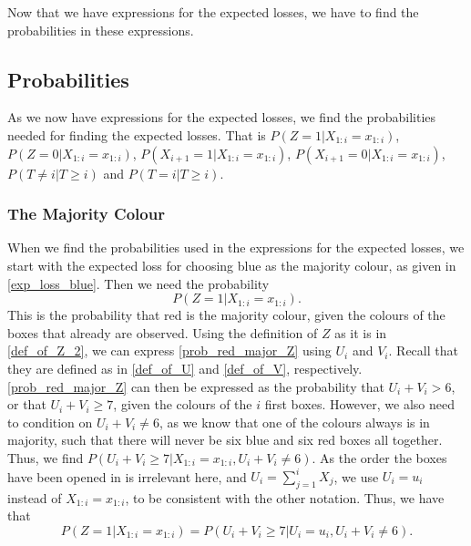 Now that we have expressions for the expected losses, we have to find the probabilities in these expressions. 



\subsection{Probabilities}
As we now have expressions for the expected losses, we find the probabilities needed for finding the expected losses. That is $P(Z=1|X_{1:i}=x_{1:i})$, $P(Z=0|X_{1:i}=x_{1:i})$, $P(X_{i+1}=1|X_{1:i}=x_{1:i})$, $P(X_{i+1}=0|X_{1:i}=x_{1:i})$, $P(T\neq i|T\geq i)$ and $P(T=i|T\geq i)$.

\subsubsection{The Majority Colour}
When we find the probabilities used in the expressions for the expected losses, we start with the expected loss for choosing blue as the majority colour, as given in \eqref{exp_loss_blue}. Then we need the probability
\begin{equation}
\label{prob_red_major_Z}
    P(Z=1|X_{1:i}=x_{1:i}).
\end{equation}
This is the probability that red is the majority colour, given the colours of the boxes that already are observed. Using the definition of $Z$ as it is in \eqref{def_of_Z_2}, we can express \eqref{prob_red_major_Z} using $U_i$ and $V_i$. Recall that they are defined as in \eqref{def_of_U} and \eqref{def_of_V}, respectively. \eqref{prob_red_major_Z} can then be expressed as the probability that $U_i+V_i>6$, or that $U_i+V_i \geq 7$, given the colours of the $i$ first boxes. However, we also need to condition on $U_i+V_i \neq 6$, as we know that one of the colours always is in majority, such that there will never be six blue and six red boxes all together. Thus, we find $P(U_i+V_i \geq 7 | X_{1:i}=x_{1:i},U_i+V_i \neq 6)$. As the order the boxes have been opened in is irrelevant here, and $U_i = \sum_{j=1}^i X_j$, we use $U_i=u_i$ instead of $X_{1:i}=x_{1:i}$, to be consistent with the other notation. Thus, we have that
\begin{equation}
\label{Z_to_U_and_V}
    P(Z=1|X_{1:i}=x_{1:i}) = P(U_i+V_i \geq 7 | U_i=u_i,U_i+V_i \neq 6).
\end{equation}

